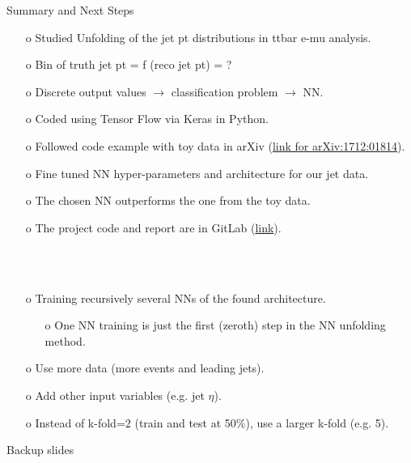 \begin{frame}{Summary and Next Steps}
\begin{enumerate}
\item[o] Studied Unfolding of the jet pt distributions in ttbar e-mu analysis.
\item[o] Bin of truth jet pt = f (reco jet pt) = ?
\item[o] Discrete output values  $\rightarrow$ classification problem $\rightarrow$ NN.
\item[o] Coded using Tensor Flow via Keras in Python.
\item[o] Followed code example with toy data in arXiv (\href{https://arxiv.org/pdf/1712.01814.pdf}{link for arXiv:1712:01814}).
\item[o] Fine tuned NN hyper-parameters and architecture for our jet data.
\item[o] The chosen NN outperforms the one from the toy data.
\item[o] The project code and report are in GitLab (\href{https://gitlab.cern.ch/lciucu/MLUnfolding/}{link}).
\end{enumerate}
\ \\
\ \\
\begin{enumerate}
\item[o] Training recursively several NNs of the found architecture.
\begin{enumerate}
\item[o] One NN training is just the first (zeroth) step in the NN unfolding method.
\end{enumerate}
\item[o] Use more data (more events and leading jets).
\item[o] Add other input variables (e.g. jet $\eta$).
\item[o] Instead of k-fold=2 (train and test at 50\%), use a larger k-fold (e.g. 5).
\end{enumerate}
\end{frame}
\clearpage

\begin{frame}{Backup slides}
\end{frame}
\clearpage

